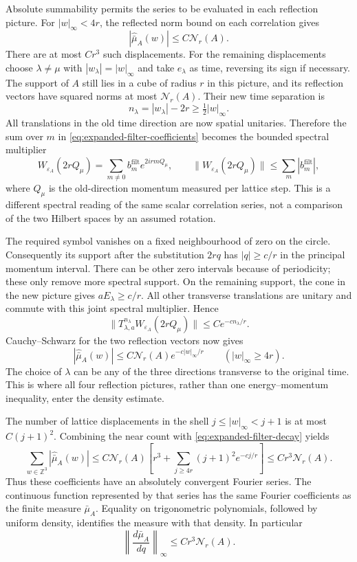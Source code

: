\documentclass[11pt,letterpaper,reqno]{amsart}
\theoremstyle{definition}
\theoremstyle{remark}
\begin{document}
Absolute summability permits the series to be evaluated in each
reflection picture. For $|w|_\infty<4r$, the reflected norm bound on
each correlation gives
\[
 |\widehat{\bar\mu}_A(w)|\le C\mathcal N_r(A).
\]
There are at most $Cr^3$ such displacements. For the remaining
displacements choose $\lambda\ne\mu$ with
$|w_\lambda|=|w|_\infty$ and take $e_\lambda$ as time, reversing
its sign if necessary. The support of $A$ still lies in a cube of
radius $r$ in this picture, and its reflection vectors have squared
norms at most $\mathcal N_r(A)$. Their new time separation is
\[
 n_\lambda=|w_\lambda|-2r\ge\tfrac12|w|_\infty.
\]
All translations in the old time direction are now spatial
unitaries. Therefore the sum over $m$ in
\eqref{eq:expanded-filter-coefficients} becomes the bounded spectral
multiplier
\[
 W_{\varepsilon_A}(2rQ_\mu)=\sum_{m\ne0}b_m^{\mathrm{filt}} e^{2irmQ_\mu},
 \qquad \|W_{\varepsilon_A}(2rQ_\mu)\|\le\sum_m|b_m^{\mathrm{filt}}|,
\]
where $Q_\mu$ is the old-direction momentum measured per lattice
step. This is a different spectral reading of the same scalar
correlation series, not a comparison of the two Hilbert spaces by
an assumed rotation.

The required symbol vanishes on a fixed neighbourhood of zero on
the circle. Consequently its support after the substitution $2rq$
has $|q|\ge c/r$ in the principal momentum interval. There can be
other zero intervals because of periodicity; these only remove more
spectral support. On the remaining support, the cone in the new
picture gives $aE_\lambda\ge c/r$. All other transverse
translations are unitary and commute with this joint spectral
multiplier. Hence
\[
 \|T_{\lambda,a}^{n_\lambda}
                   W_{\varepsilon_A}(2rQ_\mu)\|
 \le C e^{-cn_\lambda/r}.
\]
Cauchy--Schwarz for the two reflection vectors now gives
\begin{equation}\label{eq:expanded-filter-decay}
 |\widehat{\bar\mu}_A(w)|
       \le C\mathcal N_r(A)e^{-c|w|_\infty/r}
       \qquad(|w|_\infty\ge4r).
\end{equation}
The choice of $\lambda$ can be any of the three directions
transverse to the original time. This is where all four reflection
pictures, rather than one energy--momentum inequality, enter the
density estimate.

The number of lattice displacements in the shell
$j\le|w|_\infty<j+1$ is at most $C(j+1)^2$. Combining the near
count with \eqref{eq:expanded-filter-decay} yields
\[
 \sum_{w\in\mathbb Z^3}|\widehat{\bar\mu}_A(w)|
 \le C\mathcal N_r(A)
       \left[r^3+\sum_{j\ge4r}(j+1)^2e^{-cj/r}\right]
 \le Cr^3\mathcal N_r(A).
\]
Thus these coefficients have an absolutely convergent Fourier
series. The continuous function represented by that series has the
same Fourier coefficients as the finite measure $\bar\mu_A$.
Equality on trigonometric polynomials, followed by uniform density,
identifies the measure with that density. In particular
\[
 \left\|\frac{d\bar\mu_A}{dq}\right\|_\infty
                         \le Cr^3\mathcal N_r(A).
\]
\end{document}
